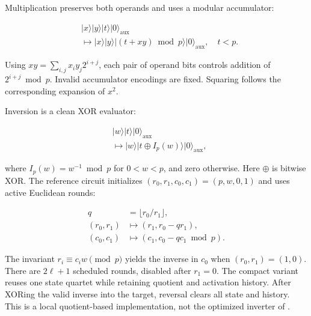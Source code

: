 \begin{revision}
Multiplication preserves both operands and uses a modular accumulator:

\begin{equation}
    \label{eq:app_r5_multiply_accumulate}
        \begin{aligned}
        &\lvert x\rangle\lvert y\rangle\lvert t\rangle
         \lvert0\rangle_{\mathrm{aux}}\\
        &\longmapsto\lvert x\rangle\lvert y\rangle
         \lvert(t+xy)\bmod p\rangle
         \lvert0\rangle_{\mathrm{aux}},\quad t<p.
    \end{aligned}
\end{equation}

Using $xy=\sum_{i,j}x_i y_j2^{i+j}$, each pair of operand bits controls addition of $2^{i+j}\bmod p$. Invalid accumulator encodings are fixed. Squaring follows the corresponding expansion of $x^2$.

Inversion is a clean XOR evaluator:

\begin{equation}
    \label{eq:app_r5_inverse_evaluator}
    \begin{aligned}
        &\lvert w\rangle\lvert t\rangle\lvert0\rangle_{\mathrm{aux}}\\
        &\longmapsto\lvert w\rangle\lvert t\oplus I_p(w)\rangle
         \lvert0\rangle_{\mathrm{aux}},
    \end{aligned}
\end{equation}

where $I_p(w)=w^{-1}\bmod p$ for $0<w<p$, and zero otherwise. Here $\oplus$ is bitwise XOR. The reference circuit initializes $(r_0,r_1,c_0,c_1)=(p,w,0,1)$ and uses active Euclidean rounds: 

\begin{equation}
    \label{eq:app_r5_euclidean_update}
    \begin{aligned}
        q&=\lfloor r_0/r_1\rfloor,\\
        (r_0,r_1)&\longmapsto(r_1,r_0-qr_1),\\
        (c_0,c_1)&\longmapsto(c_1,c_0-qc_1\bmod p).
    \end{aligned}
\end{equation}

The invariant $r_i\equiv c_iw\pmod p$ yields the inverse in $c_0$ when $(r_0,r_1)=(1,0)$. There are $2\ell+1$ scheduled rounds, disabled after $r_1=0$. The compact variant reuses one state quartet while retaining quotient and activation history. After XORing the valid inverse into the target, reversal clears all state and history. This is a local quotient-based implementation, not the optimized inverter of \cite{Roetteler2017}.


\end{revision}
